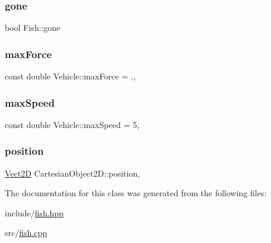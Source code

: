 \mbox{\label{classFish_a7daccde048dc63b7f8c9e6be0af56fa5_a7daccde048dc63b7f8c9e6be0af56fa5}} 
\subsubsection{\texorpdfstring{gone}{gone}}
{\footnotesize\ttfamily bool Fish\+::gone\hspace{0.3cm}{\ttfamily [private]}}

\mbox{\label{classVehicle_a95c56790e3dc52ab0fa54c279920be54_a95c56790e3dc52ab0fa54c279920be54}} 
\subsubsection{\texorpdfstring{max\+Force}{maxForce}}
{\footnotesize\ttfamily const double Vehicle\+::max\+Force = .\hspace{0.3cm}{\ttfamily [static]}, {\ttfamily [inherited]}}

\mbox{\label{classVehicle_aab47c62e89baa5b7e52c2292451fbcb6_aab47c62e89baa5b7e52c2292451fbcb6}} 
\subsubsection{\texorpdfstring{max\+Speed}{maxSpeed}}
{\footnotesize\ttfamily const double Vehicle\+::max\+Speed = 5\hspace{0.3cm}{\ttfamily [static]}, {\ttfamily [inherited]}}

\mbox{\label{classCartesianObject2D_ae02ec6ed11f9bfc0c748da033d6a32f9_ae02ec6ed11f9bfc0c748da033d6a32f9}} 
\subsubsection{\texorpdfstring{position}{position}}
{\footnotesize\ttfamily \hyperlink{classVect2D}{Vect2D} Cartesian\+Object2\+D\+::position\hspace{0.3cm}{\ttfamily [protected]}, {\ttfamily [inherited]}}



The documentation for this class was generated from the following files\+:\begin{DoxyCompactItemize}
\item 
include/\hyperlink{fish_8hpp}{fish.\+hpp}\item 
src/\hyperlink{fish_8cpp}{fish.\+cpp}\end{DoxyCompactItemize}
